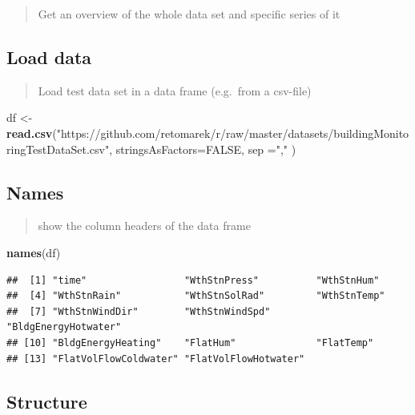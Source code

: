\documentclass[
]{book}
\newenvironment{Shaded}{\begin{snugshade}}{\end{snugshade}}
\newcommand{\DataTypeTok}[1]{\textcolor[rgb]{0.13,0.29,0.53}{#1}}
\newcommand{\KeywordTok}[1]{\textcolor[rgb]{0.13,0.29,0.53}{\textbf{#1}}}
\newcommand{\NormalTok}[1]{#1}
\newcommand{\OtherTok}[1]{\textcolor[rgb]{0.56,0.35,0.01}{#1}}
\newcommand{\StringTok}[1]{\textcolor[rgb]{0.31,0.60,0.02}{#1}}
\begin{document}
\begin{quote}
Get an overview of the whole data set and specific series of it
\end{quote}

\hypertarget{load-data}{%
\subsection{Load data}\label{load-data}}

\begin{quote}
Load test data set in a data frame (e.g.~from a csv-file)
\end{quote}

\begin{Shaded}
\begin{Highlighting}[]
\NormalTok{df <-}\StringTok{ }\KeywordTok{read.csv}\NormalTok{(}\StringTok{"https://github.com/retomarek/r/raw/master/datasets/buildingMonitoringTestDataSet.csv"}\NormalTok{, }\DataTypeTok{stringsAsFactors=}\OtherTok{FALSE}\NormalTok{, }\DataTypeTok{sep =}\StringTok{","}\NormalTok{ )}
\end{Highlighting}
\end{Shaded}

\hypertarget{names}{%
\subsection{Names}\label{names}}

\begin{quote}
show the column headers of the data frame
\end{quote}

\begin{Shaded}
\begin{Highlighting}[]
\KeywordTok{names}\NormalTok{(df)}
\end{Highlighting}
\end{Shaded}

\begin{verbatim}
##  [1] "time"                 "WthStnPress"          "WthStnHum"           
##  [4] "WthStnRain"           "WthStnSolRad"         "WthStnTemp"          
##  [7] "WthStnWindDir"        "WthStnWindSpd"        "BldgEnergyHotwater"  
## [10] "BldgEnergyHeating"    "FlatHum"              "FlatTemp"            
## [13] "FlatVolFlowColdwater" "FlatVolFlowHotwater"
\end{verbatim}

\hypertarget{structure}{%
\subsection{Structure}\label{structure}}
\end{document}
